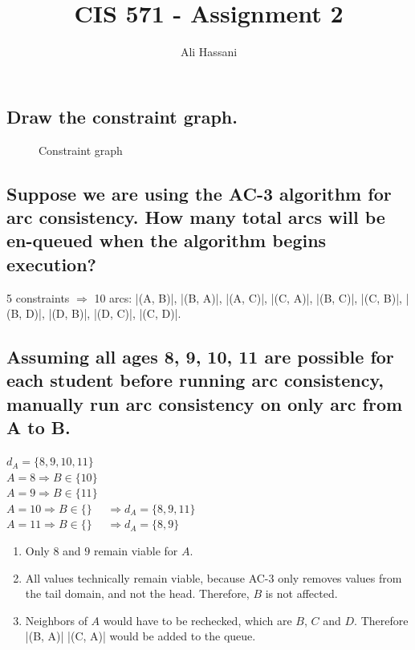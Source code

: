 \documentclass{homework}
\title{CIS 571 - Assignment 2}
\author{Ali Hassani}
\newcommand{\cmark}{\ding{51}}%
\newcommand{\xmark}{\ding{55}}%
\begin{document}
\maketitle

\renewcommand{\theenumi}{\alph{enumi}}
\renewcommand{\theenumii}{\roman{enumii}}

\exercise[1]
\subsection{Draw the constraint graph.}
\begin{figure}[h!]
    \centering
    
    \caption{Constraint graph}
    \label{fig:q11}
\end{figure}
\subsection{Suppose we are using the AC-3 algorithm for arc consistency. How many total arcs will be en-queued when the algorithm begins execution?}
5 constraints $\Rightarrow$ 10 arcs:
\cverb|(A, B)|, \cverb|(B, A)|, \cverb|(A, C)|, \cverb|(C, A)|, \cverb|(B, C)|, \cverb|(C, B)|, \cverb|(B, D)|, \cverb|(D, B)|, \cverb|(D, C)|, \cverb|(C, D)|.

\subsection{Assuming all ages {8, 9, 10, 11} are possible for each student before running arc consistency, manually run arc consistency on only arc from A to B.}
$d_A = \{8, 9, 10, 11\}$ \\
$ A = 8 \Rightarrow B \in \{10\} $ \cmark \\
$ A = 9 \Rightarrow B \in \{11\} $ \cmark \\
$ A = 10 \Rightarrow B \in \{\} $ \xmark $\quad \Rightarrow d_A = \{8, 9, 11\}$ \\
$ A = 11 \Rightarrow B \in \{\} $ \xmark $\quad\Rightarrow d_A = \{8, 9\}$ \\

\begin{enumerate}
    \item Only $8$ and $9$ remain viable for $A$.
    \item All values technically remain viable, because AC-3 only removes values from the tail domain, and not the head. Therefore, $B$ is not affected.
    \item Neighbors of $A$ would have to be rechecked, which are $B$, $C$ and $D$. Therefore \cverb|(B, A)| \cverb|(C, A)| would be added to the queue.
\end{enumerate}
\end{document}
